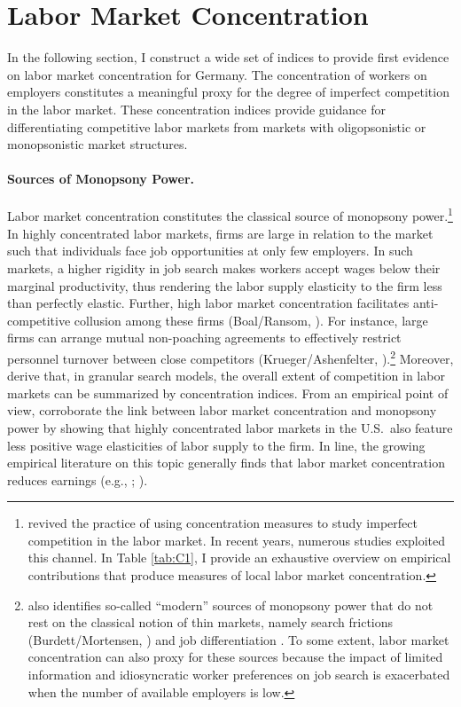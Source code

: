 \documentclass[11pt,oneside,reqno,xcolor=dvipsnames]{article} %
\begin{document}
\section{Labor Market Concentration}
\label{sec:5}

In the following section, I construct a wide set of indices to provide first evidence on labor market concentration for Germany. The concentration of workers on employers constitutes a meaningful proxy for the degree of imperfect competition in the labor market. These concentration indices provide guidance for differentiating competitive labor markets from markets with oligopsonistic or monopsonistic market structures.

\paragraph{Sources of Monopsony Power.} Labor market concentration constitutes the classical source of monopsony power.\footnote{\citet{AzarEtAl2017} revived the practice of using concentration measures to study imperfect competition in the labor market. In recent years, numerous studies exploited this channel. In Table \ref{tab:C1}, I provide an exhaustive overview on empirical contributions that produce measures of local labor market concentration.} In highly concentrated labor markets, firms are large in relation to the market such that individuals face job opportunities at only few employers. In such markets, a higher rigidity in job search makes workers accept wages below their marginal productivity, thus rendering the labor supply elasticity to the firm less than perfectly elastic. Further, high labor market concentration facilitates anti-competitive collusion among these firms (Boal/Ransom, \citeyear{BoalRansom1997}). For instance, large firms can arrange mutual non-poaching agreements to effectively restrict personnel turnover between close competitors (Krueger/Ashenfelter, \citeyear{KruegerAshenfelter2018}).\footnote{\citet{Manning2003b} also identifies so-called ``modern'' sources of monopsony power that do not rest on the classical notion of thin markets, namely search frictions (Burdett/Mortensen, \citeyear{BurdettMortensen1998}) and job differentiation \citep{CardEtAl2018}. To some extent, labor market concentration can also proxy for these sources because the impact of limited information and idiosyncratic worker preferences on job search is exacerbated when the number of available employers is low.} Moreover, \citet{JaroschEtAl2019} derive that, in granular search models, the overall extent of competition in labor markets can be summarized by concentration indices. From an empirical point of view, \citet{AzarEtAl2019b} corroborate the link between labor market concentration and monopsony power by showing that highly concentrated labor markets in the U.S.\ also feature less positive wage elasticities of labor supply to the firm. In line, the growing empirical literature on this topic generally finds that labor market concentration reduces earnings (e.g., \citealp{AzarEtAl2017}; \citealp{Rinz2020}).
\end{document}
